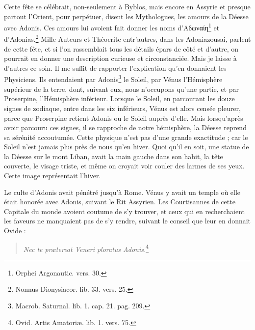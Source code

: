 \documentclass[a4paper, 11pt, oneside, polutonikogreek, french]{article}
\begin{document}
Cette fête se célébrait, non-seulement à Byblos, mais encore en Assyrie et presque partout l'Orient, pour perpétuer, disent les Mythologues, les amours de la Déesse avec Adonis. Ces amours lui avoient fait donner les noms d'Αδωναίη\footnote{Orphei Argonautic. vers. 30.} et d'Adonias.\footnote{Nonnus Dionysiacor. lib. 33. vers. 25.} Mille Auteurs et Théocrite entr'autres, dans les Adoniazousai, parlent de cette fête, et si l'on rassemblait tous les détails épars de côté et d'autre, on pourrait en donner une description curieuse et circonstanciée. Mais je laisse à d'autres ce soin. Il me suffit de rapporter l'explication qu'en donnaient les Physiciens. Ils entendaient par Adonis\footnote{Macrob. Saturnal. lib. 1. cap. 21. pag. 209.} le Soleil, par Vénus l'Hémisphère supérieur de la terre, dont, suivant eux, nous n'occupons qu'une partie, et par Proserpine, l'Hémisphère inférieur. Lorsque le Soleil, en parcourant les douze signes de zodiaque, entre dans les six inférieurs, Vénus est alors censée pleurer, parce que Proserpine retient Adonis ou le Soleil auprès d'elle. Mais lorsqu'après avoir parcouru ces signes, il se rapproche de notre hémisphère, la Déesse reprend sa sérénité accoutumée. Cette physique n'est pas d'une grande exactitude ; car le Soleil n'est jamais plus près de nous qu'en hiver. Quoi qu'il en soit, une statue de la Déesse sur le mont Liban, avait la main gauche dans son habit, la tête couverte, le visage triste, et même on croyait voir couler des larmes de ses yeux. Cette image représentait l'hiver.

Le culte d'Adonis avait pénétré jusqu'à Rome. Vénus y avait un temple où elle était honorée avec Adonis, suivant le Rit Assyrien. Les Courtisannes de cette Capitale du monde avoient coutume de s'y trouver, et ceux qui en recherchaient les faveurs ne manquaient pas de s'y rendre, suivant le conseil que leur en donnait Ovide :
\begin{quotation}
\emph{Nec te prætereat Veneri ploratus Adonis.}\footnote{Ovid. Artis Amatoriæ. lib. 1. vers. 75.}
\end{quotation}
\end{document}
